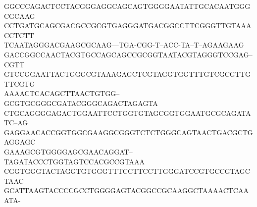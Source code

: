 \documentclass[11pt]{article}
\begin{document}
\begin{CJK}{UTF8}{gkai}
{GGCCCAGACTCCTACGGGAGGCAGCAGTGGGGAATATTGCACAATGGGCGCAAG\\
CCTGATGCAGCGACGCCGCGTGAGGGATGACGGCCTTCGGGTTGTAAACCTCTT\\
TCAATAGGGACGAAGCGCAAG---TGA-CGG-T--ACC-TA--T--AGAAGAAG\\
GACCGGCCAACTACGTGCCAGCAGCCGCGGTAATACGTAGGGTCCGAG--CGTT\\
GTCCGGAATTACTGGGCGTAAAGAGCTCGTAGGTGGTTTGTCGCGTTGTTCGTG\\
AAAACTCACAGCTTAACTGTGG--GCGTGCGGGCGATACGGGCAGACTAGAGTA\\
CTGCAGGGGAGACTGGAATTCCTGGTGTAGCGGTGGAATGCGCAGATATC--AG\\
GAGGAACACCGGTGGCGAAGGCGGGTCTCTGGGCAGTAACTGACGCTGAGGAGC\\
GAAAGCGTGGGGAGCGAACAGGAT--TAGATACCCTGGTAGTCCACGCCGTAAA\\
CGGTGGGTACTAGGTGTGGGTTTCCTTCCTTGGGATCCGTGCCGTAGCTAAC--\\
GCATTAAGTACCCCGCCTGGGGAGTACGGCCGCAAGGCTAAAACTCAAATA-\\
}


\end{CJK}
\end{document}
